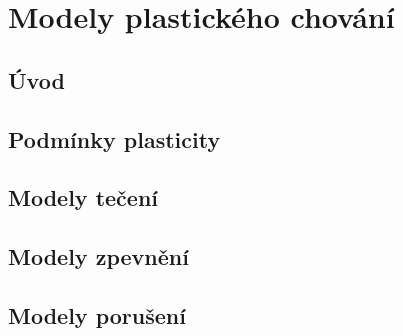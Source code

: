 \chapter{Modely plastického chování}
\section{Úvod}

\section{Podmínky plasticity}


\section{Modely tečení}



\section{Modely zpevnění}




\section{Modely porušení}

